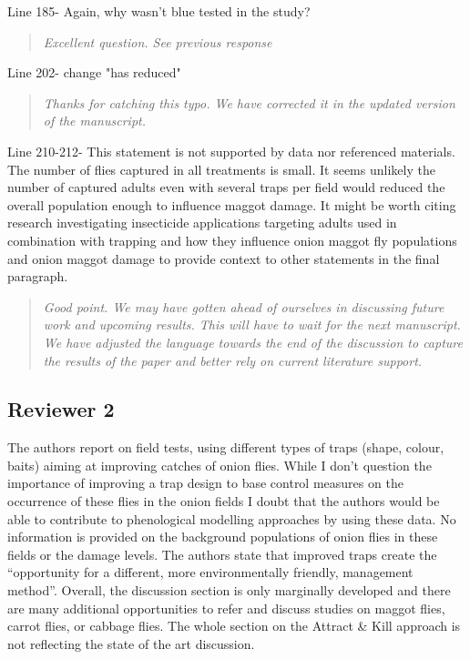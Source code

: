 \documentclass{article}
\begin{document}
Line 185- Again, why wasn't blue tested in the study?

\begin{quote}
    \textit{Excellent question.  See previous response}
\end{quote}

Line 202- change "has reduced"

\begin{quote}
    \textit{Thanks for catching this typo.  We have corrected it in the updated version of the manuscript.}
\end{quote}


Line 210-212- This statement is not supported by data nor referenced materials.  The number of flies captured in all treatments is small.  It seems unlikely the number of captured adults even with several traps per field would reduced the overall population enough to influence maggot damage.  It might be worth citing research investigating insecticide applications targeting adults used in combination with trapping and how they influence onion maggot fly populations and onion maggot damage to provide context to other statements in the final paragraph. 

\begin{quote}
    \textit{Good point.  We may have gotten ahead of ourselves in discussing future work and upcoming results.  This will have to wait for the next manuscript.  We have adjusted the language towards the end of the discussion to capture the results of the paper and better rely on current literature support.  }
\end{quote}

\subsection*{Reviewer 2}

The authors report on field tests, using different types of traps (shape, colour, baits) aiming at improving catches of onion flies. While I don’t question the importance of improving a trap design to base control measures on the occurrence of these flies in the onion fields I doubt that the authors would be able to contribute to phenological modelling approaches by using these data. No information is provided on the background populations of onion flies in these fields or the damage levels. The authors state that improved traps create the “opportunity for a different, more environmentally friendly, management method”.  Overall, the discussion section is only marginally developed and there are many additional opportunities to refer and discuss studies on maggot flies, carrot flies, or cabbage flies. The whole section on the Attract & Kill approach is not reflecting the state of the art discussion.
\end{document}
